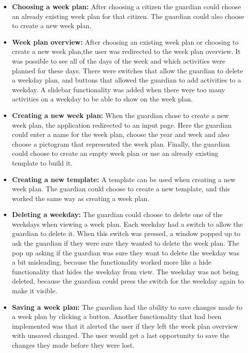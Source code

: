 \begin{itemize}
    \item \textbf{Choosing a week plan:} After choosing a citizen the guardian could choose an already existing week plan for that citizen.
    The guardian could also choose to create a new week plan.
    \item \textbf{Week plan overview:} After choosing an existing week plan or choosing to create a new week plan,the user was redirected to the week plan overview.
    It was possible to see all of the days of the week and which activities were planned for these days.
    There were switches that allow the guardian to delete a weekday plan, and buttons that allowed the guardian to add activities to a weekday.
    A slidebar functionality was added when there were too many activities on a weekday to be able to show on the week plan.
    \item \textbf{Creating a new week plan:} When the guardian chose to create a new week plan, the application redirected to an input page.
    Here the guardian could enter a name for the week plan, choose the year and week and also choose a pictogram that represented the week plan.
    Finally, the guardian could choose to create an empty week plan or use an already existing template to build it.
    \item \textbf{Creating a new template:} A template can be used when creating a new week plan.
    The guardian could choose to create a new template, and this worked the same way as creating a week plan.
    \item \textbf{Deleting a weekday:} The guardian could choose to delete one of the weekdays when viewing a week plan.
    Each weekday had a switch to allow the guardian to delete it.
    When this switch was pressed, a window popped up to ask the guardian if they were sure they wanted to delete the week plan.
    The pop up asking if the guardian was sure they want to delete the weekday was a bit misleading, because the functionality worked more like a hide functionality that hides the weekday from view.
    The weekday was not being deleted, because the guardian could press the switch for the weekday again to make it visible.
    \item \textbf{Saving a week plan:} The guardian had the ability to save changes made to a week plan by clicking a button.
    Another functionality that had been implemented was that it alerted the user if they left the week plan overview with unsaved changed.
    The user would get a last opportunity to save the changes they made before they were lost.

\end{itemize}
